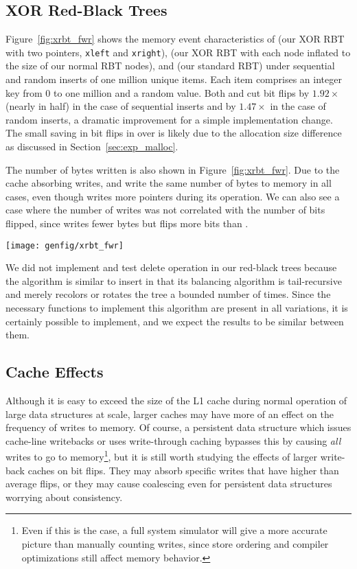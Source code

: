 \subsection{XOR Red-Black Trees}
Figure~\ref{fig:xrbt_fwr} shows the memory event characteristics of \xrbt (our XOR RBT with two
pointers, \texttt{xleft} and \texttt{xright}),
\xrbtbig (our XOR RBT with each node inflated to the size of our normal RBT nodes), and \rbt (our
standard RBT) under sequential and random inserts of one million unique items. Each item
comprises an integer key from 0 to one million and a random value.
Both \xrbt and \xrbtbig cut bit flips by $1.92\times$ (nearly in half)
in the case of sequential
inserts and by $1.47\times$ in the case of random inserts, a dramatic improvement for
a simple implementation change. The small saving in bit flips in \xrbtbig over
\xrbt is likely due to the allocation size difference as discussed in
Section~\ref{sec:exp_malloc}.

The number of bytes written is also shown in Figure~\ref{fig:xrbt_fwr}. Due to
the cache absorbing writes, \xrbtbig and \rbt write the same number of bytes to
memory in all cases, even though \rbt writes more pointers during its operation.
We can also see a case where the number of writes was not correlated with the
number of bits flipped, since \xrbt writes fewer bytes but flips more bits than
\xrbtbig.

\begin{SCfigure}
	\centering
	\texttt{[image: genfig/xrbt\_fwr]}
	\caption{Memory characteristics of XOR red-black trees compared to normal
		red-black trees.}
	\label{fig:xrbt_fwr}
\end{SCfigure}

We did not implement and test delete operation in our red-black trees because
the algorithm is similar to insert in that its balancing algorithm is
tail-recursive and merely recolors or rotates the tree a bounded number of times.
Since the necessary functions to implement this algorithm are present in all
variations, it is certainly possible to implement, and we expect the results to be similar
between them.

\subsection{Cache Effects}
\label{sec:exp_cache}

Although it is easy to exceed the size of the L1 cache during normal operation
of large data structures at scale, larger caches may have more of an effect on
the frequency of writes to memory. Of course, a persistent data structure which
issues cache-line writebacks or uses write-through caching bypasses this by
causing \textit{all} writes to go to memory\footnote{Even if this is the case, a
	full system simulator will give a more accurate picture than manually counting
	writes, since store ordering and compiler optimizations still affect memory
	behavior.}, but it is still worth studying the effects of larger write-back
caches on bit flips. They may absorb specific writes that have higher
than average flips, or they may cause coalescing even for persistent data
structures worrying about consistency.

